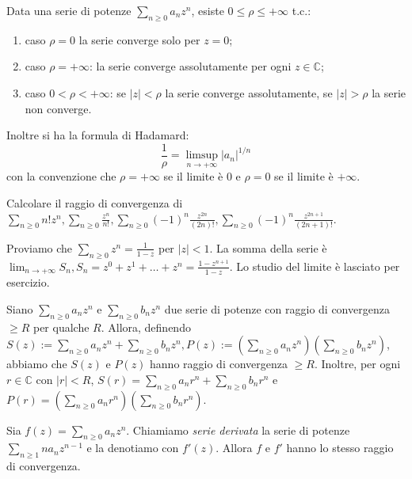 \begin{prop} \label{convergenza_serie}
  Data una serie di potenze $\displaystyle \sum_{n \ge 0} a_nz^n$, esiste $0 \le \rho \le +\infty$ t.c.:
  \begin{enumerate}
    \item caso $\rho=0$ la serie converge solo per $z=0$;
    \item caso $\rho=+\infty$: la serie converge assolutamente per ogni $z \in \mathbb{C}$;
    \item caso $0<\rho<+\infty$: se $|z|<\rho$ la serie converge assolutamente, se $|z|>\rho$ la serie non converge.
  \end{enumerate}
  Inoltre si ha la formula di Hadamard:
  $$\frac{1}{\rho}=\limsup_{n \longrightarrow +\infty} |a_n|^{1/n}$$
  con la convenzione che $\rho=+\infty$ se il limite è $0$ e $\rho=0$ se il limite è $+\infty$.
\end{prop}

\begin{exc}
  Calcolare il raggio di convergenza di \\
  $\displaystyle \sum_{n \ge 0} n!z^n, \sum_{n \ge 0} \frac{z^n}{n!}, \sum_{n \ge 0} (-1)^n \frac{z^{2n}}{(2n)!}, \sum_{n \ge 0} (-1)^n \frac{z^{2n+1}}{(2n+1)!}$.
\end{exc}

\begin{ex}
  Proviamo che $\displaystyle \sum_{n \ge 0} z^n=\frac{1}{1-z}$ per $|z|<1$. La somma della serie è $\displaystyle \lim_{n \longrightarrow +\infty}S_n, S_n=z^0+z^1+\dots+z^n=\frac{1-z^{n+1}}{1-z}$. Lo studio del limite è lasciato per esercizio.
\end{ex}

\begin{ftt}
  \begin{nlist}
    \item Siano $\displaystyle \sum_{n \ge 0} a_nz^n$ e $\displaystyle \sum_{n \ge 0} b_nz^n$ due serie di potenze con raggio di convergenza $\ge R$ per qualche $R$.
    Allora, definendo $\displaystyle S(z):=\sum_{n \ge 0} a_nz^n+\sum_{n \ge 0}b_nz^n, P(z):=\left(\sum_{n \ge 0}a_nz^n\right)\left(\sum_{n \ge 0}b_nz^n\right)$, abbiamo che $S(z)$ e $P(z)$ hanno raggio di convergenza $\ge R$.
    Inoltre, per ogni $r \in \mathbb{C}$ con $|r|<R$, $\displaystyle S(r)=\sum_{n \ge 0}a_nr^n+\sum_{n \ge 0} b_nr^n$ e $\displaystyle P(r)=\left(\sum_{n \ge 0}a_nr^n\right)\left(\sum_{n \ge 0}b_nr^n\right)$.
    \item Sia $\displaystyle f(z)=\sum_{n \ge 0} a_nz^n$. Chiamiamo \textit{serie derivata} la serie di potenze $\displaystyle \sum_{n \ge 1} na_nz^{n-1}$ e la denotiamo con $f'(z)$. Allora $f$ e $f'$ hanno lo stesso raggio di convergenza.
  \end{nlist}
\end{ftt}

